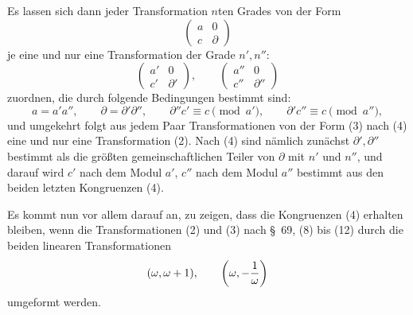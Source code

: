 \documentclass[11pt]{article}
\begin{document}
Es lassen sich dann jeder Transformation $n$ten Grades von der Form
\begin{equation}
 \begin{pmatrix}a&0\\ c&\partial\end{pmatrix}
\tag{2}
\end{equation}
je eine und nur eine Transformation der Grade $n',n''$:
\begin{equation}
 \begin{pmatrix}a'&0\\ c'&\partial'\end{pmatrix},
 \qquad
 \begin{pmatrix}a''&0\\ c''&\partial''\end{pmatrix}
\tag{3}
\end{equation}
zuordnen, die durch folgende Bedingungen bestimmt sind:
\begin{equation}
 a=a'a'',\qquad \partial=\partial'\partial'',\qquad
 \partial''c'\equiv c\pmod {a'},\qquad
 \partial'c''\equiv c\pmod {a''},
\tag{4}
\end{equation}
und umgekehrt folgt aus jedem Paar Transformationen von der Form (3) nach (4) eine und nur eine Transformation (2). Nach (4) sind nämlich zunächst $\partial',\partial''$ bestimmt als die größten gemeinschaftlichen Teiler von $\partial$ mit $n'$ und $n''$, und darauf wird $c'$ nach dem Modul $a'$, $c''$ nach dem Modul $a''$ bestimmt aus den beiden letzten Kongruenzen (4).

Es kommt nun vor allem darauf an, zu zeigen, dass die Kongruenzen (4) erhalten bleiben, wenn die Transformationen (2) und (3) nach \S~69, (8) bis (12) durch die beiden linearen Transformationen
\[
 (\omega,\omega+1),\qquad \left(\omega,-{1\over\omega}\right)
\]
umgeformt werden.
\end{document}
